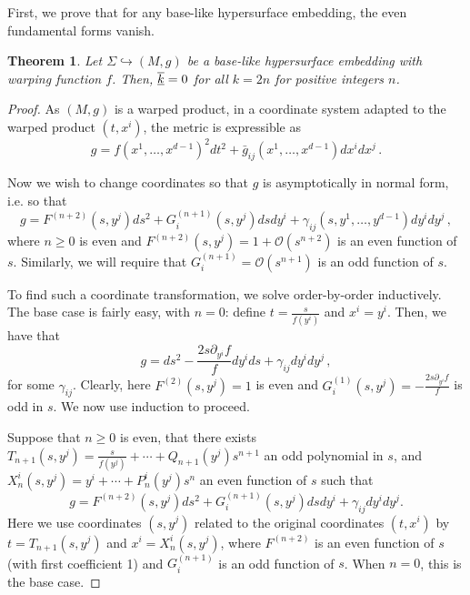 \documentclass[a4paper,10.9pt]{amsart}
\newtheorem{theorem}{Theorem}[section]
\theoremstyle{definition}
\theoremstyle{remark}
\newcommand{\II}{{\rm  I\hspace{-.2mm}I}}
\numberwithin{equation}{section}
\renewcommand{\=}{\stackrel \Sigma =}
\renewcommand\geq{\geqslant}
\newcommand{\FF}[1]{\underline{\overline{\rm{#1}}}}
\begin{document}
First, we prove that for any base-like hypersurface embedding, the even fundamental forms vanish.
\begin{theorem} \label{vanishing-evens}
Let $\Sigma \hookrightarrow (M,g)$ be a base-like hypersurface embedding with warping function $f$. Then, $\FF{k} = 0$ for all $k = 2n$ for positive integers $n$.
\end{theorem}
\begin{proof}
As $(M,g)$ is a warped product, in a coordinate system adapted to the warped product $(t, x^i)$, the metric is expressible as
$$g = f(x^1, \ldots, x^{d-1})^2 dt^2 + \bar{g}_{ij}(x^1, \ldots, x^{d-1}) dx^i dx^j\,.$$

Now we wish to change coordinates so that $g$ is asymptotically in normal form, i.e. so that
$$g = F^{(n+2)}(s,y^j) ds^2 + G_i^{(n+1)}(s,y^j) ds dy^i + \gamma_{ij}(s,y^1,\ldots,y^{d-1}) dy^i dy^j\,,$$
where $n \geq 0$ is even and $F^{(n+2)}(s,y^j) = 1 + \mathcal{O}(s^{n+2})$ is an even function of $s$. Similarly, we will require that $G_i^{(n+1)} = \mathcal{O}(s^{n+1})$ is an odd function of $s$.

To find such a coordinate transformation, we solve order-by-order inductively. The base case is fairly easy, with $n=0$: define $t = \frac{s}{f(y^i)}$ and $x^i = y^i$. Then, we have that
$$g = ds^2 - \frac{2s \partial_{y^i} f}{f}  dy^i ds + \gamma_{ij} dy^i dy^j \,,$$
for some $\gamma_{ij}$. Clearly, here $F^{(2)}(s,y^j) = 1$ is even and $G_i^{(1)}(s,y^j) = -\frac{2s \partial_{y^i} f}{f}$ is odd in $s$.
We now use induction to proceed. 

Suppose that $n \geq 0$ is even, that there exists $T_{n+1}(s,y^j) = \frac{s}{f(y^j)} + \cdots + Q_{n+1}(y^j) s^{n+1}$ an odd polynomial in $s$, and $X^i_{n}(s,y^j) = y^i + \cdots + P^i_{n}(y^j) s^{n}$ an even function of $s$ such that
$$g = F^{(n+2)}(s,y^j) ds^2 + G_i^{(n+1)}(s,y^j) ds dy^i + \gamma_{ij} dy^i dy^j.$$
Here we use coordinates $(s,y^j)$ related to the original coordinates $(t,x^i)$ by
$t = T_{n+1}(s,y^j)$ and $x^i = X^i_{n}(s,y^j)$, where $F^{(n+2)}$ is an even function of $s$ (with first coefficient 1)
and $G_i^{(n+1)}$ is an odd function of $s$. When $n=0$, this is the base case.


\end{proof}
\end{document}
